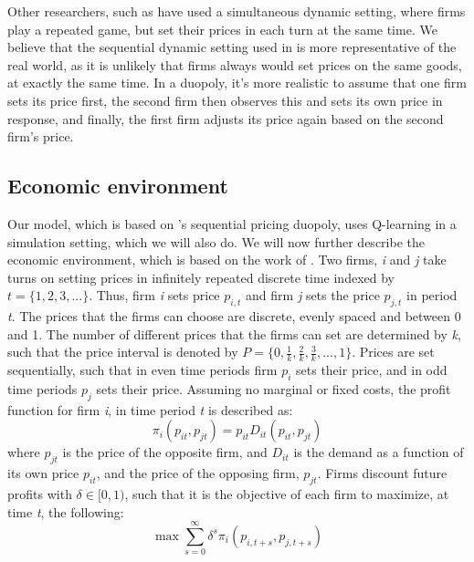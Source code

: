 \documentclass{article}
\begin{document}
Other researchers, such as \cite{Calvano} have used a simultaneous dynamic setting, where firms play a repeated game, but set their prices in each turn at the same time. We believe that the sequential dynamic setting used in \cite{Klein2021} is more representative of the real world, as it is unlikely that firms always would set prices on the same goods, at exactly the same time. In a duopoly, it's more realistic to assume that one firm sets its price first, the second firm then observes this and sets its own price in response, and finally, the first firm adjusts its price again based on the second firm's price.





\subsection{Economic environment}
\label{economic Environment}
Our model, which is based on \cite{Klein2021}'s sequential pricing duopoly, uses Q-learning in a simulation setting, which we will also do.
We will now further describe the economic environment, which is based on the work of \cite{Klein2021}. 
\newline
Two firms, \textit{i} and \textit{j} take turns on setting prices in infinitely repeated discrete time indexed by $t = \{1,2,3,... \} $. Thus, firm \textit{i} sets price $p_{i,t}$ and firm \textit{j} sets the price $p_{j,t}$ in period \textit{t}. 
The prices that the firms can choose are discrete, evenly spaced and between 0 and 1. The number of different prices that the firms can set are determined by \textit{k}, such that the price interval is denoted by $P = \{0, \frac{1}{k}, \frac{2}{k}, \frac{3}{k},...,1\} $. Prices are set sequentially, such that in even time periods firm $p_i$ sets their price, and in odd time periods $p_j$ sets their price.
\newline
Assuming no marginal or fixed costs, the profit function for firm \textit{i}, in time period \textit{t} is described as:
\begin{equation}
    \pi_i (p_{it},p_{jt}) = p_{it}D_{it}(p_{it},p_{jt})
\end{equation}
where $p_{jt}$ is the price of the opposite firm, and $D_{it}$ is the demand as a function of its own price $p_{it}$, and the price of the opposing firm, $p_{jt}$.
Firms discount future profits with $\delta \in [0,1)$, such that it is the objective of each firm to maximize, at time \textit{t}, the following:
\begin{equation}
\max\sum_{s=0}^{\infty}\delta^s\pi_i(p_{i,t+s},p_{j,t+s})
\end{equation}
\end{document}
